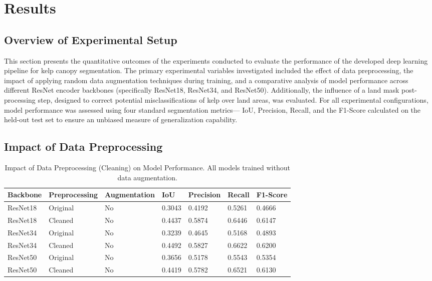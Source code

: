 \documentclass{article}
\begin{document}
\section{Results}

\subsection{Overview of Experimental Setup} %

This section presents the quantitative outcomes of the experiments conducted to evaluate the performance of the developed deep learning pipeline for kelp canopy segmentation. The primary experimental variables investigated included the effect of data preprocessing, the impact of applying random data augmentation techniques during training, and a comparative analysis of model performance across different ResNet encoder backbones (specifically ResNet18, ResNet34, and ResNet50). Additionally, the influence of a land mask post-processing step, designed to correct potential misclassifications of kelp over land areas, was evaluated. For all experimental configurations, model performance was assessed using four standard segmentation metrics— IoU, Precision, Recall, and the F1-Score calculated on the held-out test set to ensure an unbiased measure of generalization capability.

\subsection{Impact of Data Preprocessing}

\begin{table}[htbp] %
  \caption{Impact of Data Preprocessing (Cleaning) on Model Performance. All models trained without data augmentation.}
  \label{table:preprocessing_impact}
  \centering
  \begin{tabular}{lllllll}
    \toprule
    Backbone & Preprocessing & Augmentation & IoU    & Precision & Recall & F1-Score \\
    \midrule
    ResNet18 & Original      & No           & 0.3043 & 0.4192    & 0.5261 & 0.4666   \\
    ResNet18 & Cleaned       & No           & 0.4437 & 0.5874    & 0.6446 & 0.6147   \\
    ResNet34 & Original      & No           & 0.3239 & 0.4645    & 0.5168 & 0.4893   \\
    ResNet34 & Cleaned       & No           & 0.4492 & 0.5827    & 0.6622 & 0.6200   \\
    ResNet50 & Original      & No           & 0.3656 & 0.5178    & 0.5543 & 0.5354   \\
    ResNet50 & Cleaned       & No           & 0.4419 & 0.5782    & 0.6521 & 0.6130   \\
    \bottomrule
  \end{tabular}
\end{table}
\end{document}
